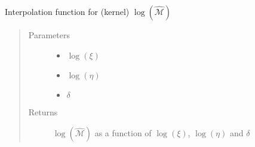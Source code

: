 \documentclass[letterpaper,10pt,english]{sphinxmanual}
\begin{document}

\begin{fulllineitems}
\label{\detokenize{diffsph.spectra:diffsph.spectra.synchrotron.lMst}}
\sphinxAtStartPar
Interpolation function for (kernel) \(\log(\hat{\mathcal M})\)
\begin{quote}\begin{description}
\item[{Parameters}] \leavevmode\begin{itemize}
\item {} 
\sphinxAtStartPar
{} \textendash{} \(\log(\xi)\)

\item {} 
\sphinxAtStartPar
{} \textendash{} \(\log(\eta)\)

\item {} 
\sphinxAtStartPar
{} \textendash{} \(\delta\)

\end{itemize}

\item[{Returns}] \leavevmode
\sphinxAtStartPar
\(\log(\hat{\mathcal M})\) as a function of \(\log(\xi)\), \(\log(\eta)\) and \(\delta\)

\end{description}\end{quote}

\end{fulllineitems}

\end{document}
